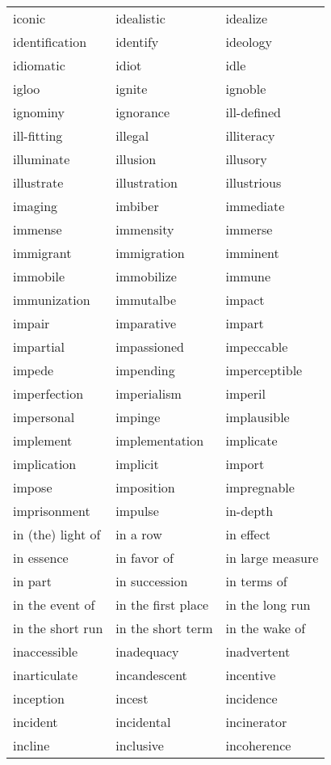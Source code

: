 \documentclass{minimal}
\begin{document}
\begin{longtable}{p{2.8cm}p{2.8cm}p{2.8cm}}
iconic & idealistic & idealize \\
identification & identify & ideology \\
idiomatic & idiot & idle \\
igloo & ignite & ignoble \\
ignominy & ignorance & ill-defined \\
ill-fitting & illegal & illiteracy \\
illuminate & illusion & illusory \\
illustrate & illustration & illustrious \\
imaging & imbiber & immediate \\
immense & immensity & immerse \\
immigrant & immigration & imminent \\
immobile & immobilize & immune \\
immunization & immutalbe & impact \\
impair & imparative & impart \\
impartial & impassioned & impeccable \\
impede & impending & imperceptible \\
imperfection & imperialism & imperil \\
impersonal & impinge & implausible \\
implement & implementation & implicate \\
implication & implicit & import \\
impose & imposition & impregnable \\
imprisonment & impulse & in-depth \\
in (the) light of & in a row & in effect \\
in essence & in favor of & in large measure \\
in part & in succession & in terms of \\
in the event of & in the first place & in the long run \\
in the short run & in the short term & in the wake of \\
inaccessible & inadequacy & inadvertent \\
inarticulate & incandescent & incentive \\
inception & incest & incidence \\
incident & incidental & incinerator \\
incline & inclusive & incoherence \\

\end{longtable}
\end{document}
